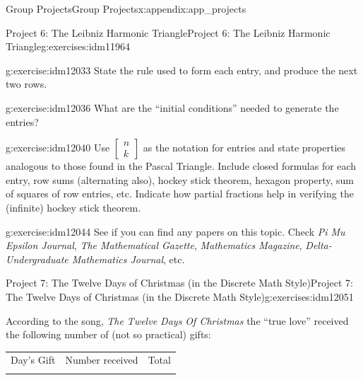 \documentclass[oneside,10pt,]{book}
\numberwithin{equation}{chapter}
\newcommand{\hrulemedium}{\noalign{\hrule height 0.07em}}
\begin{document}
\begin{appendixptx}{Group Projects}{}{Group Projects}{}{}{x:appendix:app_projects}
\begin{exercises-section-numberless}{Project 6: The Leibniz Harmonic Triangle}{}{Project 6: The Leibniz Harmonic Triangle}{}{}{g:exercises:idm11964}
\begin{sidebyside}{1}{0}{0}{0}
\begin{sbspanel}{1}
{\par}
\end{sbspanel}%
\end{sidebyside}%
\begin{divisionexercise}{1}{}{}{g:exercise:idm12033}%
State the rule used to form each entry, and produce the next two rows.%
\end{divisionexercise}%
\begin{divisionexercise}{2}{}{}{g:exercise:idm12036}%
What are the ``initial conditions'' needed to generate the entries?%
\end{divisionexercise}%
\begin{divisionexercise}{3}{}{}{g:exercise:idm12040}%
Use \(\begin{bmatrix} n\\ k \end{bmatrix}\) as the notation for entries and state properties analogous to those found in the Pascal Triangle. Include closed formulas for each entry, row sums (alternating also), hockey stick theorem, hexagon property, sum of squares of row entries, etc. Indicate how partial fractions help in verifying the (infinite) hockey stick theorem.%
\end{divisionexercise}%
\begin{divisionexercise}{4}{}{}{g:exercise:idm12044}%
See if you can find any papers on this topic. Check \emph{Pi Mu Epsilon Journal}, \emph{The Mathematical Gazette}, \emph{Mathematics Magazine}, \emph{Delta-Undergraduate Mathematics Journal}, etc.%
\end{divisionexercise}%
\end{exercises-section-numberless}
%
%
\typeout{************************************************}
\typeout{************************************************}
%
\begin{exercises-section-numberless}{Project 7: The Twelve Days of Christmas (in the Discrete Math Style)}{}{Project 7: The Twelve Days of Christmas (in the Discrete Math Style)}{}{}{g:exercises:idm12051}
\begin{introduction}{}%
According to the song, \emph{The Twelve Days Of Christmas} the ``true love'' received the following number of (not so practical) gifts:%
\begin{sidebyside}{1}{0.2}{0.2}{0}%
\begin{sbspanel}{0.6}%
{\centering%
\begin{tabular}{lll}
Day's Gift&Number received&Total\tabularnewline\hrulemedium

\end{tabular}}
\end{sbspanel}
\end{sidebyside}
\end{introduction}
\end{exercises-section-numberless}
\end{appendixptx}
\end{document}

